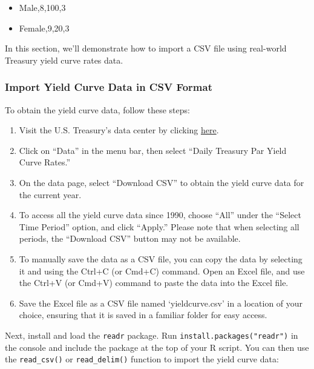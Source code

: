 \documentclass[
]{book}
\providecommand{\tightlist}{%
  \setlength{\itemsep}{0pt}\setlength{\parskip}{0pt}}
\begin{document}
\begin{itemize}
\tightlist
\item
  Male,8,100,3
\item
  Female,9,20,3
\end{itemize}

In this section, we'll demonstrate how to import a CSV file using real-world Treasury yield curve rates data.

\hypertarget{import-yield-curve-data-in-csv-format}{%
\subsubsection*{Import Yield Curve Data in CSV Format}\label{import-yield-curve-data-in-csv-format}}

To obtain the yield curve data, follow these steps:

\begin{enumerate}
\def\labelenumi{\arabic{enumi}.}
\tightlist
\item
  Visit the U.S. Treasury's data center by clicking \href{https://www.treasury.gov/resource-center/data-chart-center}{here}.
\item
  Click on ``Data'' in the menu bar, then select ``Daily Treasury Par Yield Curve Rates.''
\item
  On the data page, select ``Download CSV'' to obtain the yield curve data for the current year.
\item
  To access all the yield curve data since 1990, choose ``All'' under the ``Select Time Period'' option, and click ``Apply.'' Please note that when selecting all periods, the ``Download CSV'' button may not be available.
\item
  To manually save the data as a CSV file, you can copy the data by selecting it and using the Ctrl+C (or Cmd+C) command. Open an Excel file, and use the Ctrl+V (or Cmd+V) command to paste the data into the Excel file.
\item
  Save the Excel file as a CSV file named `yieldcurve.csv' in a location of your choice, ensuring that it is saved in a familiar folder for easy access.
\end{enumerate}

Next, install and load the \texttt{readr} package. Run \texttt{install.packages("readr")} in the console and include the package at the top of your R script. You can then use the \texttt{read\_csv()} or \texttt{read\_delim()} function to import the yield curve data:
\end{document}
